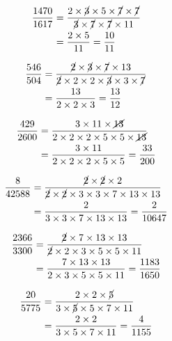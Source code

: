 {{\item\begin{align*}
    \dfrac{1470}{1617} &=
    \dfrac{2 \times \cancel{3} \times 5 \times \cancel{7} \times \cancel{7}}
    {\cancel{3} \times \cancel{7} \times \cancel{7} \times 11}\\ &=
    \dfrac{2 \times 5}
    {11} =
    \dfrac{10}{11}
    \end{align*}

\item\begin{align*}
    \dfrac{546}{504} &=
    \dfrac{\cancel{2} \times \cancel{3} \times \cancel{7} \times 13}
    {\cancel{2} \times 2 \times 2 \times \cancel{3} \times 3 \times \cancel{7}}\\ &=
    \dfrac{13}
    {2 \times 2 \times 3} =
    \dfrac{13}{12}
    \end{align*}

\item\begin{align*}
    \dfrac{429}{2600} &=
    \dfrac{3 \times 11 \times \cancel{13}}
    {2 \times 2 \times 2 \times 5 \times 5 \times \cancel{13}}\\ &=
    \dfrac{3 \times 11}
    {2 \times 2 \times 2 \times 5 \times 5} =
    \dfrac{33}{200}
    \end{align*}

\item\begin{align*}
    \dfrac{8}{42588} &=
    \dfrac{\cancel{2} \times \cancel{2} \times 2}
    {\cancel{2} \times \cancel{2} \times 3 \times 3 \times 7 \times 13 \times 13}\\ &=
    \dfrac{2}
    {3 \times 3 \times 7 \times 13 \times 13} =
    \dfrac{2}{10647}
    \end{align*}

\item\begin{align*}
    \dfrac{2366}{3300} &=
    \dfrac{\cancel{2} \times 7 \times 13 \times 13}
    {\cancel{2} \times 2 \times 3 \times 5 \times 5 \times 11}\\ &=
    \dfrac{7 \times 13 \times 13}
    {2 \times 3 \times 5 \times 5 \times 11} =
    \dfrac{1183}{1650}
    \end{align*}

\item\begin{align*}
    \dfrac{20}{5775} &=
    \dfrac{2 \times 2 \times \cancel{5}}
    {3 \times \cancel{5} \times 5 \times 7 \times 11}\\ &=
    \dfrac{2 \times 2}
    {3 \times 5 \times 7 \times 11} =
    \dfrac{4}{1155}
    \end{align*}

}}
